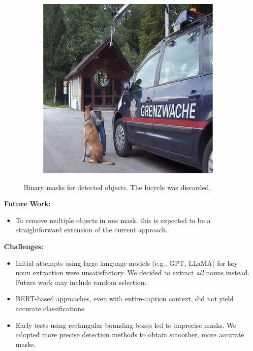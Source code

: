 \documentclass[11pt,letterpaper]{article}
\begin{document}
\begin{figure}[h]
\begin{subfigure}[b]{0.3\textwidth}
        \includegraphics[width=\textwidth]{midterm_report/assets/output_person (1).png}
        \label{fig:mask_person}
    \end{subfigure}
    \caption{Binary masks for detected objects. The bicycle was discarded.}
    \label{fig:mask_comparison}
\end{figure}

\noindent
\textbf{Future Work:}
\begin{itemize}
  \item To remove multiple objects in one mask, this is expected to be a straightforward extension of the current approach.

\end{itemize}

\noindent
\textbf{Challenges:}
\begin{itemize}
    \item Initial attempts using large language models (e.g., GPT, LLaMA) for key noun extraction were unsatisfactory. We decided to extract \emph{all} nouns instead. Future work may include random selection.
    \item BERT-based approaches, even with entire-caption context, did not yield accurate classifications.
    \item Early tests using rectangular bounding boxes led to imprecise masks. We adopted more precise detection methods to obtain smoother, more accurate masks.
\end{itemize}
\end{document}

